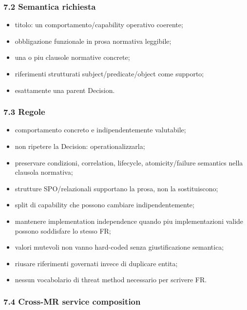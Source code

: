 \documentclass[
  9pt,
  a4paper,
]{article}
\providecommand{\tightlist}{%
  \setlength{\itemsep}{0pt}\setlength{\parskip}{0pt}}
\begin{document}
\subsubsection{7.2 Semantica richiesta}\label{semantica-richiesta-1}

\begin{itemize}
\tightlist
\item
  titolo: un comportamento/capability operativo coerente;
\item
  obbligazione funzionale in prosa normativa leggibile;
\item
  una o piu clausole normative concrete;
\item
  riferimenti strutturati subject/predicate/object come supporto;
\item
  esattamente una parent Decision.
\end{itemize}

\subsubsection{7.3 Regole}\label{regole-1}

\begin{itemize}
\tightlist
\item
  comportamento concreto e indipendentemente valutabile;
\item
  non ripetere la Decision: operationalizzarla;
\item
  preservare condizioni, correlation, lifecycle, atomicity/failure
  semantics nella clausola normativa;
\item
  strutture SPO/relazionali supportano la prosa, non la sostituiscono;
\item
  split di capability che possono cambiare indipendentemente;
\item
  mantenere implementation independence quando piu implementazioni
  valide possono soddisfare lo stesso FR;
\item
  valori mutevoli non vanno hard-coded senza giustificazione semantica;
\item
  riusare riferimenti governati invece di duplicare entita;
\item
  nessun vocabolario di threat method necessario per scrivere FR.
\end{itemize}

\subsubsection{7.4 Cross-MR service
composition}\label{cross-mr-service-composition}
\end{document}
